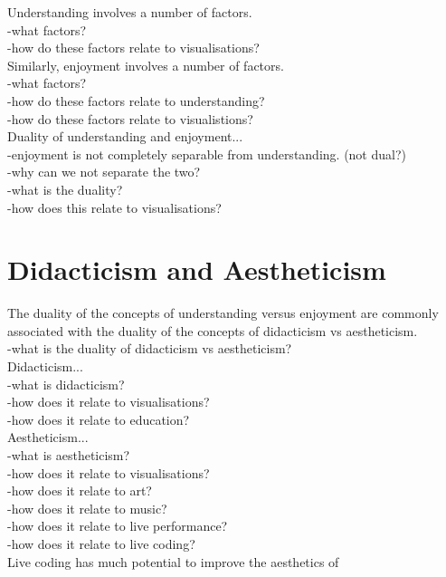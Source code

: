 Understanding involves a number of factors.\\
-what factors?\\
-how do these factors relate to visualisations?\\

Similarly, enjoyment involves a number of factors.\\
-what factors?\\
-how do these factors relate to understanding?\\
-how do these factors relate to visualistions?\\

Duality of understanding and enjoyment...\\
-enjoyment is not completely separable from understanding. (not dual?)\\
-why can we not separate the two?\\
-what is the duality?\\
-how does this relate to visualisations?\\


\section{Didacticism and Aestheticism}

The duality of the concepts of understanding versus enjoyment are commonly associated with the duality of the concepts of didacticism vs aestheticism.\\
-what is the duality of didacticism vs aestheticism?\\

Didacticism...\\
-what is didacticism?\\
-how does it relate to visualisations?\\
-how does it relate to education?\\

Aestheticism...\\
-what is aestheticism?\\
-how does it relate to visualisations?\\
-how does it relate to art?\\
-how does it relate to music?\\
-how does it relate to live performance?\\
-how does it relate to live coding? \cite{Bell}\\
Live coding has much potential to improve the aesthetics of 


